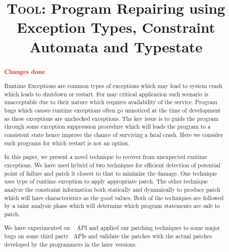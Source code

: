 \documentclass[pldi]{sigplanconf}
\def\tool{\textsc{Tool}\xspace}
\def\papertitle{\tool: Program Repairing using Exception Types, Constraint
Automata and Typestate}
\begin{document}
\title{\Large \bf \papertitle}

\maketitle

\begin{abstract}
\small
\textcolor{red}{\textbf{Changes done}}\newline

Runtime Exceptions are common types of exceptions which may lead to system crash
which leads to shutdown or restart. For may critical application such scenario
is unacceptable due to their nature which requires availability of the service. 
Program bugs which causes runtime exceptions often go unnoticed at the time of
development as these exceptions are unchecked exceptions. The key issue is to
guide the program through some exception suppression procedure which will leads
the program to a consistent state hence improve the chance of surviving a fatal
crash. Here we consider such programs for which restart is not an option.

In this paper, we present a novel technique to recover from unexpected runtime
exceptions. We have used hybrid of two techniques for efficient detection of
potential point of failure and patch it closest to that to minimize the damage. 
One technique uses type of runtime exception to apply appropriate patch. The
other technique analyze the constraint information both statically and
dynamically to produce patch which will have characteristics as the good values.
Both of the techniques are followed by a taint analysis phase which will
determine which program statements are safe to patch.

We have experimented on \java\  API and applied our patching
techniques to some major bugs on some third party \java\ APIs and validate the
patches with the actual patches developed by the programmers in the later
versions.

\end{abstract}

% 














\raggedright
\small


\end{document}
